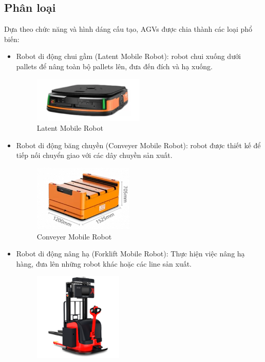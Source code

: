     \subsection{Phân loại}
    \hspace*{0.6cm}Dựa theo chức năng và hình dáng cấu tạo, AGVs được chia thành các loại phổ biến:
    \begin{itemize}
        \item Robot di động chui gầm (Latent Mobile Robot): robot chui xuống dưới pallets để nâng toàn bộ pallets lên, đưa đến đích và hạ xuống.
            \begin{figure}[H]
                \centering
                \includegraphics[width=0.5\textwidth]{pictures/chapter1/chapter1_pic_1.png}
                \caption{Latent Mobile Robot}
                \label{chap1_pic1}
            \end{figure}
        \item Robot di động băng chuyền (Conveyer Mobile Robot): robot được thiết kế để tiếp nối chuyển giao với các dây chuyền sản xuất.
            \begin{figure}[H]
                \centering
                \includegraphics[width=0.45\textwidth]{pictures/chapter1/chapter1_pic_2.png}
                \caption{Conveyer Mobile Robot}
                \label{chap1_pic2}
            \end{figure}
        \item Robot di động nâng hạ (Forklift Mobile Robot): Thực hiện việc nâng hạ hàng, đưa lên những robot khác hoặc các line sản xuất.
            \begin{figure}[H]
                \centering
                \includegraphics[width=0.4\textwidth]{pictures/chapter1/chapter1_pic_3.png}

\end{figure}
\end{itemize}
